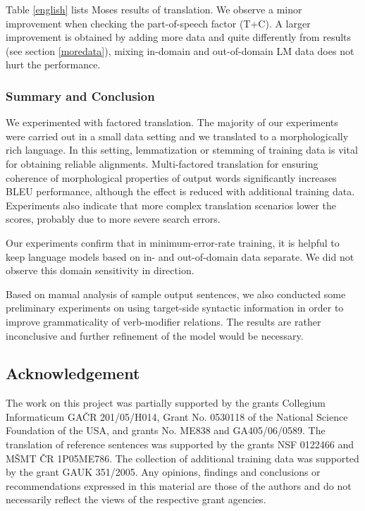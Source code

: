 \documentclass[11pt]{book}
\theoremstyle{plain}
\begin{document}
Table \ref{english} lists Moses results of \toen{} translation. We observe a
minor improvement when checking the part-of-speech factor (T+C). A larger
improvement is obtained
by adding more data and quite differently from \tocs{} results (see section
\ref{moredata}), mixing in-domain
and out-of-domain LM data does not hurt the performance.




\subsubsection{Summary and Conclusion}

We experimented with factored \tocs{} translation. The majority of our
experiments were carried out in a small data setting and we translated to a
morphologically rich language. In this setting, lemmatization or stemming of
training data is vital for obtaining reliable alignments. Multi-factored
translation for ensuring coherence of morphological properties of output words
significantly increases BLEU performance, although the effect is reduced with
additional training data. Experiments also indicate that more complex
translation scenarios lower the scores, probably due to more severe search
errors.

Our \tocs{} experiments confirm that in minimum-error-rate training, it is
helpful to keep language models based on in- and out-of-domain data separate. We
did not observe this domain sensitivity in \toen{} direction.

Based on manual analysis of sample output sentences, we also conducted some
preliminary experiments on using target-side syntactic information in order to
improve grammaticality of verb-modifier relations.  The results are rather
inconclusive and further refinement of the model would be necessary.



\subsection{Acknowledgement}

The work on this project was partially supported by the grants 
Collegium Informaticum GA\v{C}R 201/05/H014,
Grant No. 0530118 of the National Science Foundation of the USA,
and grants No. ME838 and GA405/06/0589.
The translation of reference sentences was supported by the grants
NSF 0122466 and M\v{S}MT \v{C}R 1P05ME786. The collection of additional training
data was supported by the grant GAUK 351/2005.
Any opinions, findings and conclusions or recommendations expressed in this
material are those of the authors and do not necessarily reflect the views of
the respective grant agencies.
\end{document}
